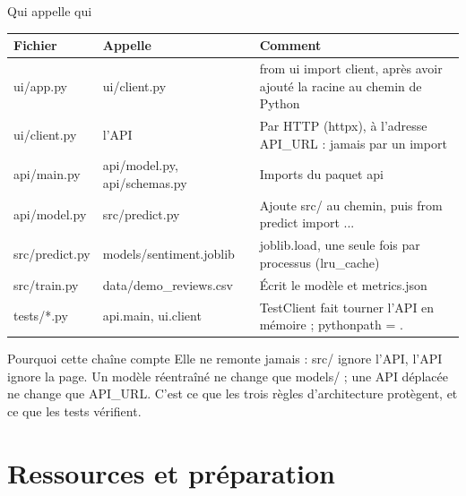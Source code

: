 \documentclass[aspectratio=169,11pt]{beamer}
\newcommand{\co}[1]{{\ttfamily\hyphenchar\font=45\relax #1}}
\renewcommand{\arraystretch}{1.2}
\begin{document}
\begin{frame}{Qui appelle qui}
\tiny\renewcommand{\arraystretch}{1.15}
\begin{tabularx}{\textwidth}{@{}l l X@{}}
\toprule
\textbf{Fichier} & \textbf{Appelle} & \textbf{Comment} \\
\midrule
\co{ui/app.py} & \co{ui/client.py} & \co{from ui import client}, après avoir ajouté la racine au chemin de Python \\
\co{ui/client.py} & l'API & Par HTTP (httpx), à l'adresse \co{API\_URL} : jamais par un import \\
\co{api/main.py} & \co{api/model.py}, \co{api/schemas.py} & Imports du paquet \co{api} \\
\co{api/model.py} & \co{src/predict.py} & Ajoute \co{src/} au chemin, puis \co{from predict import ...} \\
\co{src/predict.py} & \co{models/sentiment.joblib} & \co{joblib.load}, une seule fois par processus (\co{lru\_cache}) \\
\co{src/train.py} & \co{data/demo\_reviews.csv} & Écrit le modèle et \co{metrics.json} \\
\co{tests/*.py} & \co{api.main}, \co{ui.client} & \co{TestClient} fait tourner l'API en mémoire ; \co{pythonpath = .} \\
\bottomrule
\end{tabularx}

\medskip
\begin{exampleblock}{Pourquoi cette chaîne compte}
\scriptsize Elle ne remonte jamais : \co{src/} ignore l'API, l'API ignore la page. Un modèle réentraîné ne change
que \co{models/} ; une API déplacée ne change que \co{API\_URL}. C'est ce que les trois règles d'architecture
protègent, et ce que les tests vérifient.
\end{exampleblock}
\end{frame}

\section{Ressources et préparation}
\end{document}
